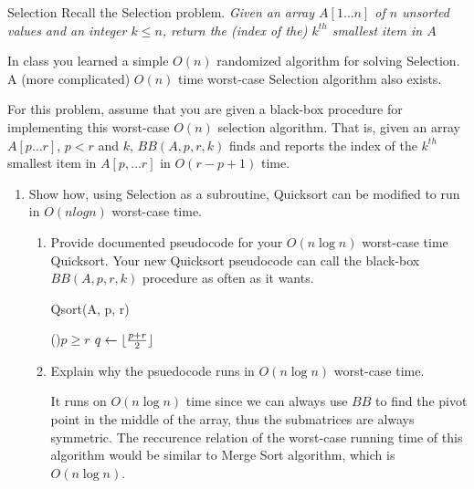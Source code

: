 \documentclass{article}
\begin{document}
\begin{section}{Selection}
Recall the Selection problem. {\em Given an array $A[1 \dots n]$ of $n$ unsorted values and an integer $k \leq n$, return the (index of the) $k^{th}$ smallest item in $A$}

In class you learned a simple $O(n)$ randomized algorithm for solving Selection. A (more complicated) $O(n)$ time worst-case Selection algorithm also exists.

For this problem, assume that you are given a black-box procedure for implementing this worst-case $O(n)$ selection algorithm. That is, given an array $A[p \dots r]$, $p < r$ and $k$, $BB(A, p, r, k)$ finds and reports the index of the $k^{th}$ smallest item in $A[p, \dots r]$ in $O(r - p + 1)$ time.

\begin{enumerate}
    \item  Show how, using Selection as a subroutine, Quicksort can be modified to run in $O(n log n)$ worst-case time.
    
    \begin{enumerate}
        \item Provide documented pseudocode for your $O(n \log n)$ worst-case time Quicksort. Your new Quicksort pseudocode can call the black-box $BB(A, p, r, k)$ procedure as often as it wants.
        
        \begin{minipage}{\linewidth}
        \begin{algorithm}[H]
        \caption{Qsort(A, p, r)}
            \eIf(){$p \geq r$}{\KwRet}
            {
                $q \gets \lfloor\frac{p+r}{2}\rfloor$ 
                 \\
                 
                 
                 
            }
        \end{algorithm}
        \end{minipage}
        
        \item Explain why the psuedocode runs in $O(n \log n)$ worst-case time.
        
        It runs on $O(n \log n)$ time since we can always use $BB$ to find the pivot point in the middle of the array, thus the submatrices are always symmetric. The reccurence relation of the worst-case running time of this algorithm would be similar to Merge Sort algorithm, which is $O(n \log n)$.
    \end{enumerate}
    

\end{enumerate}
\end{section}
\end{document}

